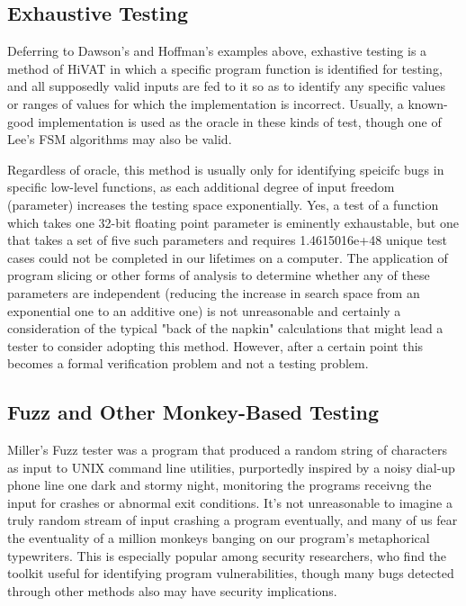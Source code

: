 \subsection{Exhaustive Testing}
Deferring to Dawson's and Hoffman's examples above, exhastive testing is a method of HiVAT in which a specific program function is identified for testing, and all supposedly valid inputs are fed to it so as to identify any specific values or ranges of values for which the implementation is incorrect. Usually, a known-good implementation is used as the oracle in these kinds of test, though one of Lee's FSM algorithms may also be valid.

Regardless of oracle, this method is usually only for identifying speicifc bugs in specific low-level functions, as each additional degree of input freedom (parameter) increases the testing space exponentially. Yes, a test of a function which takes one 32-bit floating point parameter is eminently exhaustable, but one that takes a set of five such parameters and requires 1.4615016e+48 unique test cases could not be completed in our lifetimes on a computer. The application of program slicing \citep{gallagher1991using} or other forms of analysis to determine whether any of these parameters are independent (reducing the increase in search space from an exponential one to an additive one) is not unreasonable and certainly a consideration of the typical "back of the napkin" calculations that might lead a tester to consider adopting this method. However, after a certain point this becomes a formal verification problem and not a testing problem.

\subsection{Fuzz and Other Monkey-Based Testing}
 Miller's Fuzz tester was a program that produced a random string of characters as input to UNIX command line utilities, purportedly inspired by a noisy dial-up phone line one dark and stormy night, monitoring the programs receivng the input for crashes or abnormal exit conditions. It's not unreasonable to imagine a truly random stream of input crashing a program eventually, and many of us fear the eventuality of a million monkeys banging on our program's metaphorical typewriters. This is especially popular among security researchers, who find the toolkit useful for identifying program vulnerabilities, though many bugs detected through other methods also may have security implications.

